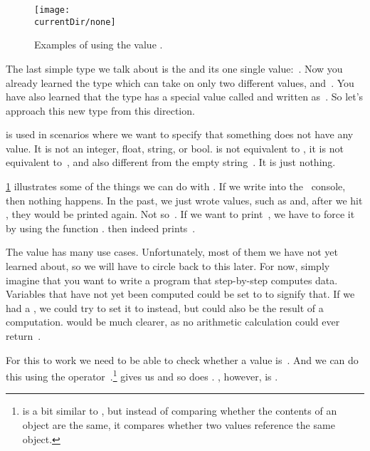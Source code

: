 %
\label{sec:none}%
%
\begin{figure}%
\centering%
\texttt{[image: \\currentDir/none]}%
\caption{Examples of using the value .}%
\label{fig:none}%
\end{figure}%
%
The last simple type we talk about is the  and its one single value:~.
Now you already learned the type  which can take on only two different values,  and~.
You have also learned that the type  has a special value called  and written as~.
So let's approach this new type from this direction.

 is used in scenarios where we want to specify that something does not have any value.
It is not an integer, float, string, or bool.
 is not equivalent to , it is not equivalent to~, and also different from the empty string~\pythonIdx{\textquotedbl\textquotedbl}.
It is just nothing.

\cref{fig:none} illustrates some of the things we can do with .
If we write  into the \python\ console, then nothing happens.
In the past, we just wrote values, such as  and, after we hit \keys{\enter}, they would be printed again.
Not so~.
If we want to print~, we have to force it by using the function .
 then indeed prints~.

The value  has many use cases.
Unfortunately, most of them we have not yet learned about, so we will have to circle back to this later.
For now, simply imagine that you want to write a program that step-by-step computes data.
Variables that have not yet been computed could be set to  to signify that.
If we had a , we could try to set it to  instead, but  could also be the result of a computation.
 would be much clearer, as no arithmetic calculation could ever return~.

For this to work we need to be able to check whether a value is~.
And we can do this using the operator~.\footnote{%
 is a bit similar to \pythonilIdx{==}, but instead of comparing whether the contents of an object are the same, it compares whether two values reference the same object.}%
 gives us  and so does .
, however, is .

